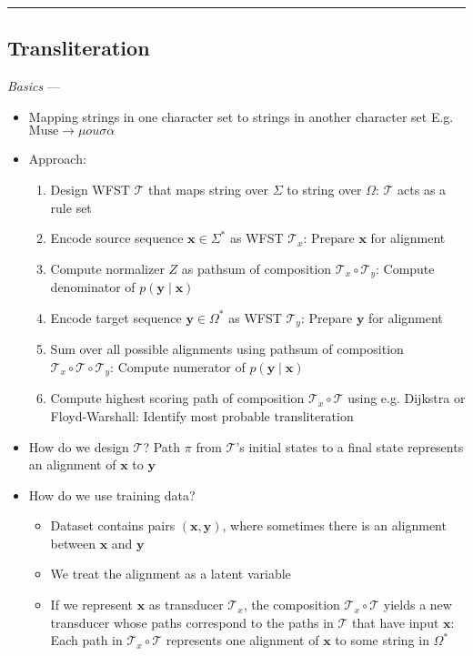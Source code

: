 {\color{black}\hrule height 0.001mm}

\subsection*{Transliteration}
\emph{Basics} ---
\begin{itemize}
    \item Mapping strings in one character set to strings in another character set E.g. $\textrm{Muse} \to \mu ou \sigma \alpha$
    \item Approach:
    \begin{enumerate}
        \item Design WFST $\mathcal{T}$ that maps string over $\Sigma$ to string over $\Omega$: $\mathcal{T}$ acts as a rule set
        \item Encode source sequence $\boldsymbol{x} \in \Sigma^*$ as WFST $\mathcal{T}_x$: Prepare $\boldsymbol{x}$ for alignment
        \item Compute normalizer $Z$ as pathsum of composition $\mathcal{T}_x \circ \mathcal{T}_y$: Compute denominator of $p(\boldsymbol{y} \mid \boldsymbol{x})$
        \item Encode target sequence $\boldsymbol{y} \in \Omega^*$ as WFST $\mathcal{T}_y$: Prepare $\boldsymbol{y}$ for alignment
        \item Sum over all possible alignments using pathsum of composition $\mathcal{T}_x \circ \mathcal{T} \circ \mathcal{T}_y$: Compute numerator of $p(\boldsymbol{y} \mid \boldsymbol{x})$
        \item Compute highest scoring path of composition $\mathcal{T}_x \circ \mathcal{T}$ using e.g. Dijkstra or Floyd-Warshall: Identify most probable transliteration
    \end{enumerate}
    \item How do we design $\mathcal{T}$? Path $\pi$ from $\mathcal{T}$'s initial states to a final state represents an alignment of $\boldsymbol{x}$ to $\boldsymbol{y}$
    \item How do we use training data?
    \begin{itemize}
        \item Dataset contains pairs $(\boldsymbol{x}, \boldsymbol{y})$, where sometimes there is an alignment between $\boldsymbol{x}$ and $\boldsymbol{y}$
        \item We treat the alignment as a latent variable
        \item If we represent $\boldsymbol{x}$ as transducer $\mathcal{T}_x$, the composition $\mathcal{T}_x \circ \mathcal{T}$ yields a new transducer whose paths correspond to the paths in $\mathcal{T}$ that have input $\boldsymbol{x}$: Each path in $\mathcal{T}_x \circ \mathcal{T}$ represents one alignment of $\boldsymbol{x}$ to some string in $\Omega^*$

\end{itemize}
\end{itemize}
